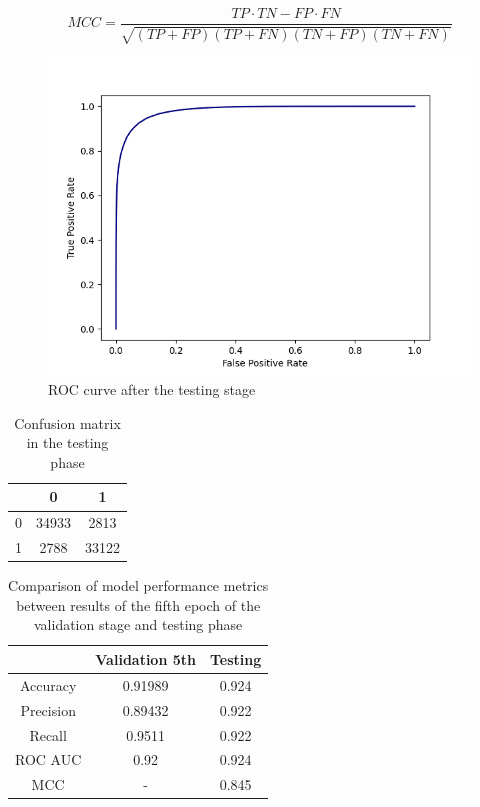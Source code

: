 \documentclass[12pt]{article}
\begin{document}
	\begin{equation}
		\label{MCC}
		MCC = \frac{TP \cdot TN - FP \cdot FN}{\sqrt{(TP+FP)(TP+FN)(TN+FP)(TN+FN)}} 
	\end{equation}

	\begin{figure}[h!]
		\centering
		\includegraphics[scale=0.7]{testing_0_3068.png}

		\caption{ ROC curve after the testing stage}
		\label{figure:SLP003testing}
	\end{figure}

	\begin{table}[h!]
		\caption{Confusion matrix in the testing phase}
		\vspace{0.2cm}
		\centering
		\begin{tabular}{ | c | c c | }
			\hline 
			& 0 & 1 \\
			\hline  
			0 & 34933 & 2813 \\
			1 & 2788 & 33122 \\
			\hline    
		\end{tabular}
		\label{table:SLP003confusionMatrixTesting}
	\end{table}

	\begin{table}[h!]
		\caption{Comparison of model performance metrics between 
		results of the fifth epoch of the validation stage and 
		testing phase}
		\vspace{0.2cm}
		\centering
		\begin{tabular}{ | c c c | }
			\hline 
			& Validation 5th & Testing \\
			\hline
			Accuracy & 0.91989 & 0.924 \\
			Precision & 0.89432 & 0.922 \\
			Recall & 0.9511 & 0.922 \\
			ROC AUC & 0.92 & 0.924 \\
			MCC & - & 0.845 \\
			\hline 
		\end{tabular}
		\label{table:SLP003metricsTesting}
	\end{table}
\end{document}
